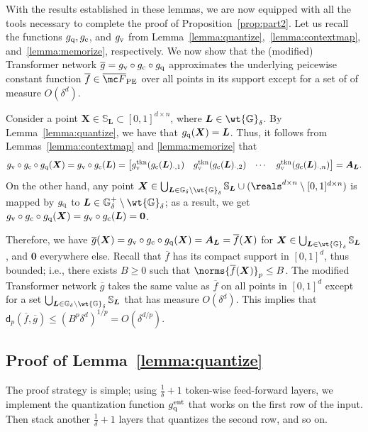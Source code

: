 \documentclass{article} %
\def\vzero{{\bm{0}}}
\def\mA{{\bm{A}}}
\def\mL{{\bm{L}}}
\def\mX{{\bm{X}}}
\def\sG{{\mathbb{G}}}
\def\sS{{\mathbb{S}}}
\newcommand{\funcdist}{\mathsf{d}}
\begin{document}
With the results established in these lemmas, we are now equipped with all the tools necessary to complete the proof of Proposition~\ref{prop:part2}. Let us recall the functions $g_{\rm q}, g_{\rm c}$, and $g_{\rm v}$ from Lemma~\ref{lemma:quantize},~\ref{lemma:contextmap}, and~\ref{lemma:memorize}, respectively. We now show that the (modified) Transformer network $\overline{g} = g_{\rm v}\circ g_{\rm c} \circ g_{\rm q}$ approximates the underlying peicewise constant function $\overline{f} \in \overline{\mc F}_{\rm PE}$ over all points in its support except for a set of of measure $O(\delta^d)$.

Consider a point $\mX \in \sS_\mL \subset [0,1]^{d \times n}$, where $\mL \in \wt {\sG}_{\delta}$. By Lemma~\ref{lemma:quantize}, we have that $g_{\rm q}(\mX) = \mL$. Thus, it follows from Lemmas~\ref{lemma:contextmap} and \ref{lemma:memorize} that
$$
g_{\rm v}\circ g_{\rm c} \circ g_{\rm q}(\mX) = g_{\rm v}\circ g_{\rm c}(\mL) = \begin{bmatrix}
    g_{\rm v}^{\rm tkn} (g_{\rm c}(\mL)_{\cdot, 1}) &
    g_{\rm v}^{\rm tkn} (g_{\rm c}(\mL)_{\cdot, 2}) &
    \cdots &
    g_{\rm v}^{\rm tkn} (g_{\rm c}(\mL)_{\cdot, n})
    \end{bmatrix}
    =
    \mA_\mL.
$$
On the other hand, any point $\mX \in \bigcup_{\mL \in \sG_{\delta} \setminus \wt {\sG}_{\delta}} \sS_\mL \cup (\reals^{d\times n} \setminus [0,1]^{d \times n})$ is mapped by $g_{\rm q}$ to $\mL \in \sG^+_{\delta} \setminus \wt {\sG}_{\delta}$; as a result, we get $g_{\rm v}\circ g_{\rm c} \circ g_{\rm q}(\mX) = g_{\rm v} \circ g_{\rm c} (\mL) = \vzero$.

Therefore, we have $\overline{g}(\mX) = g_{\rm v} \circ g_{\rm c} \circ g_{\rm q}(\mX) = \mA_\mL = \overline f(\mX)$ for $\mX \in \bigcup_{\mL \in \wt {\sG}_{\delta}} \sS_\mL$, and $\vzero$ everywhere else. Recall that $\overline{f}$ has its compact support in $[0,1]^{d}$, thus bounded; i.e., there exists $B \geq 0$ such that $\norms{\overline f(\mX)}_p \leq B$. The modified Transformer network $\overline{g}$ takes the same value as $\overline{f}$ on all points in $[0,1]^{d}$ except for a set $\bigcup_{\mL \in \sG_{\delta} \setminus \wt {\sG}_{\delta}} \sS_\mL$ that has measure $O(\delta^d)$. This implies that $\funcdist_p(\overline{f}, \overline{g}) \leq (B^p \delta^d)^{1/p} = O(\delta^{d/p})$.

\subsection{Proof of Lemma~\ref{lemma:quantize}}
The proof strategy is simple; using $\frac{1}{\delta}+1$ token-wise feed-forward layers, we implement the quantization function $g_{\rm q}^{\rm ent}$ that works on the first row of the input. Then stack another $\frac{1}{\delta}+1$ layers that quantizes the second row, and so on.
\end{document}
